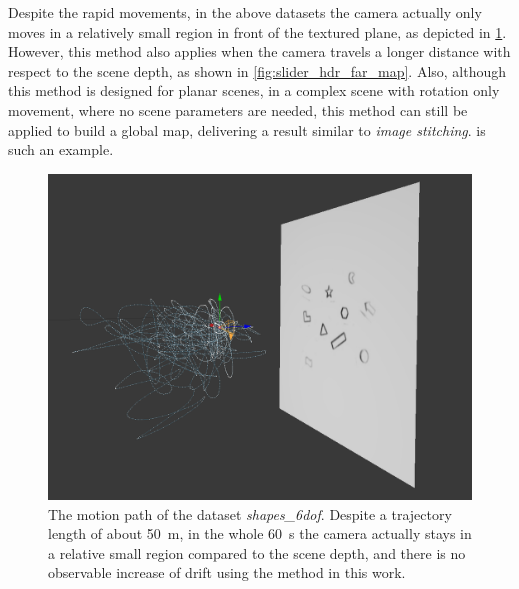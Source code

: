   Despite the rapid movements, in the above datasets the camera
  actually only moves in a relatively small region in front of the
  textured plane, as depicted in \cref{fig:shapes_6dof_path}. However,
  this method also applies when the camera travels a longer distance
  with respect to the scene depth, as shown in
  \cref{fig:slider_hdr_far_map}. Also, although this method is
  designed for planar scenes, in a complex scene with rotation only
  movement, where no scene parameters are needed, this method can
  still be applied to build a global map, delivering a result similar
  to \textit{image stitching}.  is such
  an example.
  \begin{figure}[h]
    \centering
    \includegraphics[width=\textwidth]{images/shapes_6dof_path.png}
    \caption{The motion path of the dataset
      \textit{shapes\_6dof}. Despite a trajectory length of about
      \SI{50}{\meter}, in the whole \SI{60}{\second} the camera
      actually stays in a relative small region compared to the scene
      depth, and there is no observable increase of drift using the
      method in this work.}
    \label{fig:shapes_6dof_path}
  \end{figure}
